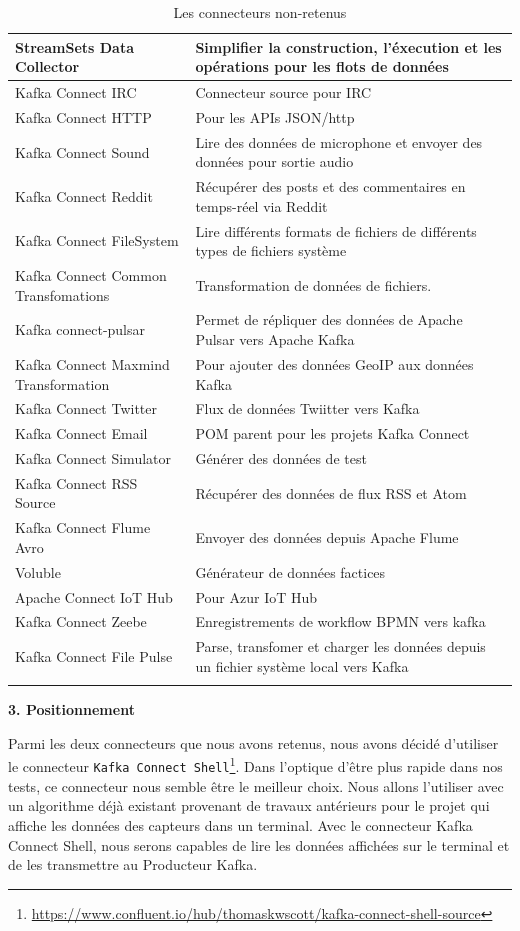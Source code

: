 \documentclass[11pt]{article}
\begin{document}
\begin{longtable}{|p{7.5cm}|p{7.5cm}|}
				StreamSets Data Collector & Simplifier la construction, l’éxecution et les opérations pour les flots de données\\\hline
				Kafka Connect IRC & Connecteur source pour IRC\\\hline
				Kafka Connect HTTP & Pour les APIs JSON/http\\\hline
				Kafka Connect Sound & Lire des données de microphone et envoyer des données pour sortie audio\\\hline
				Kafka Connect Reddit & Récupérer des posts et des commentaires en temps-réel via Reddit\\\hline
				Kafka Connect FileSystem & Lire différents formats de fichiers de différents types de fichiers système\\\hline
				Kafka Connect Common Transfomations & Transformation de données de fichiers.\\\hline
				Kafka connect-pulsar & Permet de répliquer des données de Apache Pulsar vers Apache Kafka\\\hline
				Kafka Connect Maxmind Transformation & Pour ajouter des données GeoIP aux données Kafka\\\hline
				Kafka Connect Twitter & Flux de données Twiitter vers Kafka\\\hline
				Kafka Connect Email & POM parent pour les projets Kafka Connect\\\hline
				Kafka Connect Simulator & Générer des données de test\\\hline
				Kafka Connect RSS Source & Récupérer des données de flux RSS et Atom\\\hline
				Kafka Connect Flume Avro & Envoyer des données depuis Apache Flume\\\hline
				Voluble & Générateur de données factices\\\hline
				Apache Connect IoT Hub & Pour Azur IoT Hub\\\hline
				Kafka Connect Zeebe	& Enregistrements de workflow BPMN vers kafka\\\hline
				Kafka Connect File Pulse & Parse, transfomer et charger les données  depuis un fichier système local vers Kafka\\\hline
				\caption{Les connecteurs non-retenus}
				\label{tab:connecteursnon}
			\end{longtable}\par
			\textbf{3. Positionnement}\par
			Parmi les deux connecteurs que nous avons retenus, nous avons décidé d'utiliser le connecteur \texttt{Kafka Connect Shell}\footnote{\href{https://www.confluent.io/hub/thomaskwscott/kafka-connect-shell-source}{https://www.confluent.io/hub/thomaskwscott/kafka-connect-shell-source}}.
			Dans l'optique d'être plus rapide dans nos tests, ce connecteur nous semble être le meilleur choix.
			Nous allons l'utiliser avec un algorithme déjà existant provenant de travaux antérieurs pour le projet qui affiche les données des capteurs dans un terminal.
			Avec le connecteur Kafka Connect Shell, nous serons capables de lire les données affichées sur le terminal et de les transmettre au Producteur Kafka.
\end{document}

